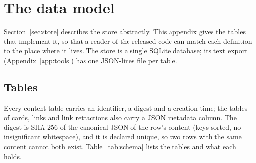 \section{The data model}\label{app:schema}

Section~\ref{sec:store} describes the store abstractly. This appendix gives the tables that implement it, so that a reader of the released code can match each definition to the place where it lives. The store is a single SQLite database; its text export (Appendix~\ref{app:tools}) has one JSON-lines file per table.

\subsection{Tables}
Every content table carries an identifier, a digest and a creation time; the tables of cards, links and link retractions also carry a JSON metadata column. The digest is SHA-256 of the canonical JSON of the row's content (keys sorted, no insignificant whitespace), and it is declared unique, so two rows with the same content cannot both exist. Table~\ref{tab:schema} lists the tables and what each holds.

